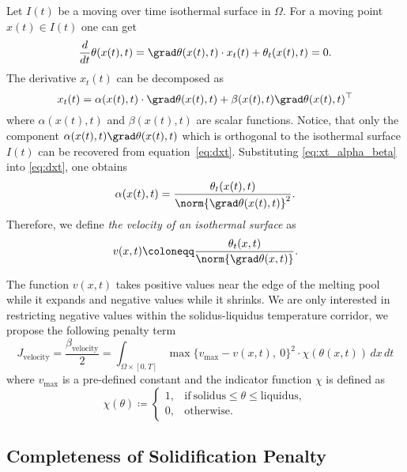 Let $I(t)$ be a moving over time isothermal surface in $\Omega$. For a moving point $x(t) \in I(t)$ one can get
\begin{equation} \label{eq:dxt}
	\frac{d}{dt} \theta(x(t),t) = \grad \theta(x(t),t) \cdot x_t(t) + \theta_t(x(t),t) = 0.
\end{equation}
The derivative $x_t(t)$ can be decomposed as
\begin{equation} \label{eq:xt_alpha_beta}
	x_t(t) = \alpha(x(t),t) \cdot \grad \theta(x(t),t) + \beta(x(t),t) \grad \theta(x(t),t)^{\top}
\end{equation}
where $\alpha(x(t),t)$ and $\beta(x(t),t)$ are scalar functions. Notice, that only the component $\alpha(x(t),t) \grad \theta(x(t),t)$ which is orthogonal to the isothermal surface $I(t)$ can be recovered from equation~\eqref{eq:dxt}. Substituting \eqref{eq:xt_alpha_beta} into \eqref{eq:dxt}, one obtains
\begin{equation}
	\alpha(x(t),t) = \frac{\theta_t(x(t),t)}{\norm{\grad \theta(x(t),t)}^2}.
\end{equation}
Therefore, we define \emph{the velocity of an isothermal surface} as
\begin{equation}
	v(x,t) \coloneqq \frac{\theta_t(x,t)}{\norm{\grad \theta(x,t)}}.
\end{equation}

The function $v(x,t)$ takes positive values near the edge of the melting pool while it expands and negative values while it shrinks. We are only interested in restricting negative values within the solidus-liquidus temperature corridor, we propose the following penalty term
\begin{equation}
	J_{\text{velocity}} = \frac{\beta_\text{velocity}}{2} =
	\int_{\Omega \times [0,T]} \max \{ v_{\max} - v(x,t),\ 0 \}^2 \cdot \chi(\theta(x,t))\, dx\,dt
\end{equation}
where $v_{\max}$ is a pre-defined constant and the indicator function $\chi$ is defined as
\begin{equation}
	\chi(\theta) \coloneqq \left\{
		\begin{array}{ll}
			1, & \text{if}\ \text{solidus} \le \theta \le \text{liquidus}, \\
			0, & \text{otherwise}.
		\end{array} \right.
\end{equation}


\subsection{Completeness of Solidification Penalty}

